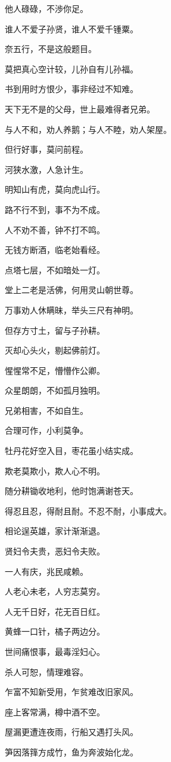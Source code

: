 \documentclass[12pt,oneside]{book}
\begin{document}
他人碌碌，不渉你足。

谁人不爱子孙贤，谁人不爱千锺粟。

奈五行，不是这般题目。

莫把真心空计较，儿孙自有儿孙福。

书到用时方恨少，事非经过不知难。

天下无不是的父母，世上最难得者兄弟。

与人不和，劝人养鹅；与人不睦，劝人架屋。

但行好事，莫问前程。

河狭水激，人急计生。

明知山有虎，莫向虎山行。

路不行不到，事不为不成。

人不劝不善，钟不打不鸣。

无钱方断酒，临老始看经。

点塔七层，不如暗处一灯。

堂上二老是活佛，何用灵山朝世尊。

万事劝人休瞒昧，举头三尺有神明。

但存方寸土，留与子孙耕。

灭却心头火，剔起佛前灯。

惺惺常不足，懵懵作公卿。

众星朗朗，不如孤月独明。

兄弟相害，不如自生。

合理可作，小利莫争。

牡丹花好空入目，枣花虽小结实成。

欺老莫欺小，欺人心不明。

随分耕锄收地利，他时饱满谢苍天。

得忍且忍，得耐且耐。不忍不耐，小事成大。

相论逞英雄，家计渐渐退。

贤妇令夫贵，恶妇令夫败。

一人有庆，兆民咸赖。

人老心未老，人穷志莫穷。

人无千日好，花无百日红。

黄蜂一口针，橘子两边分。

世间痛恨事，最毒淫妇心。

杀人可恕，情理难容。

乍富不知新受用，乍贫难改旧家风。

座上客常满，樽中酒不空。

屋漏更遭连夜雨，行船又遇打头风。

笋因落箨方成竹，鱼为奔波始化龙。
\end{document}
